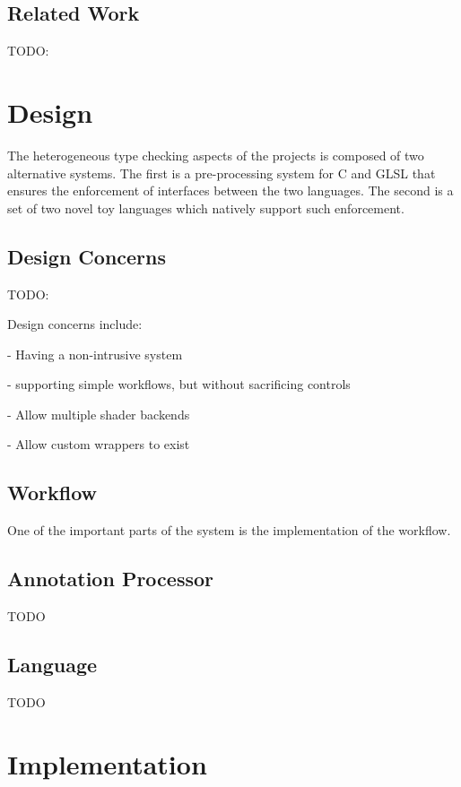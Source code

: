 \documentclass[a4paper,12pt,twoside,openright]{report}
\begin{document}
\section{Related Work}

\label{sec:related_work}

TODO:

\chapter{Design}

The heterogeneous type checking aspects of the projects is composed of two
alternative systems. The first is a pre-processing system for C and GLSL that
ensures the enforcement of interfaces between the two languages. The second is
a set of two novel toy languages which natively support such enforcement.

\section{Design Concerns}

TODO:

Design concerns include:

 - Having a non-intrusive system

 - supporting simple workflows, but without sacrificing controls

 - Allow multiple shader backends

 - Allow custom wrappers to exist

\section{Workflow}

One of the important parts of the system is the implementation of the workflow.

\section{Annotation Processor}

TODO

\section{Language}

TODO

\chapter{Implementation}
\end{document}
